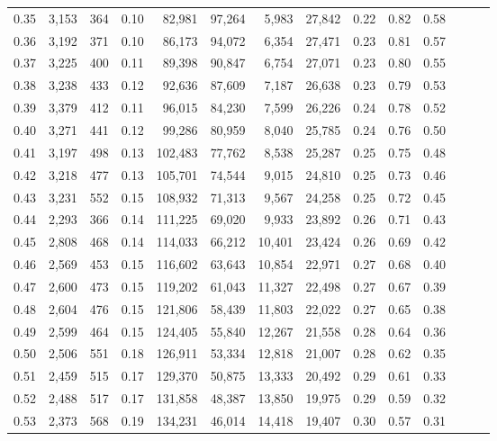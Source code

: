 \begin{tabular}{rrrrrrrrrrrrrr}
0.35 &  3,153 &  364 &  0.10 &   82,981 &   97,264 &   5,983 &  27,842 &  0.22 &  0.82 &      0.58 \\
0.36 &  3,192 &  371 &  0.10 &   86,173 &   94,072 &   6,354 &  27,471 &  0.23 &  0.81 &      0.57 \\
0.37 &  3,225 &  400 &  0.11 &   89,398 &   90,847 &   6,754 &  27,071 &  0.23 &  0.80 &      0.55 \\
0.38 &  3,238 &  433 &  0.12 &   92,636 &   87,609 &   7,187 &  26,638 &  0.23 &  0.79 &      0.53 \\
0.39 &  3,379 &  412 &  0.11 &   96,015 &   84,230 &   7,599 &  26,226 &  0.24 &  0.78 &      0.52 \\
0.40 &  3,271 &  441 &  0.12 &   99,286 &   80,959 &   8,040 &  25,785 &  0.24 &  0.76 &      0.50 \\
0.41 &  3,197 &  498 &  0.13 &  102,483 &   77,762 &   8,538 &  25,287 &  0.25 &  0.75 &      0.48 \\
0.42 &  3,218 &  477 &  0.13 &  105,701 &   74,544 &   9,015 &  24,810 &  0.25 &  0.73 &      0.46 \\
0.43 &  3,231 &  552 &  0.15 &  108,932 &   71,313 &   9,567 &  24,258 &  0.25 &  0.72 &      0.45 \\
0.44 &  2,293 &  366 &  0.14 &  111,225 &   69,020 &   9,933 &  23,892 &  0.26 &  0.71 &      0.43 \\
0.45 &  2,808 &  468 &  0.14 &  114,033 &   66,212 &  10,401 &  23,424 &  0.26 &  0.69 &      0.42 \\
0.46 &  2,569 &  453 &  0.15 &  116,602 &   63,643 &  10,854 &  22,971 &  0.27 &  0.68 &      0.40 \\
0.47 &  2,600 &  473 &  0.15 &  119,202 &   61,043 &  11,327 &  22,498 &  0.27 &  0.67 &      0.39 \\
0.48 &  2,604 &  476 &  0.15 &  121,806 &   58,439 &  11,803 &  22,022 &  0.27 &  0.65 &      0.38 \\
0.49 &  2,599 &  464 &  0.15 &  124,405 &   55,840 &  12,267 &  21,558 &  0.28 &  0.64 &      0.36 \\
0.50 &  2,506 &  551 &  0.18 &  126,911 &   53,334 &  12,818 &  21,007 &  0.28 &  0.62 &      0.35 \\
0.51 &  2,459 &  515 &  0.17 &  129,370 &   50,875 &  13,333 &  20,492 &  0.29 &  0.61 &      0.33 \\
0.52 &  2,488 &  517 &  0.17 &  131,858 &   48,387 &  13,850 &  19,975 &  0.29 &  0.59 &      0.32 \\
0.53 &  2,373 &  568 &  0.19 &  134,231 &   46,014 &  14,418 &  19,407 &  0.30 &  0.57 &      0.31 \\

\end{tabular}
